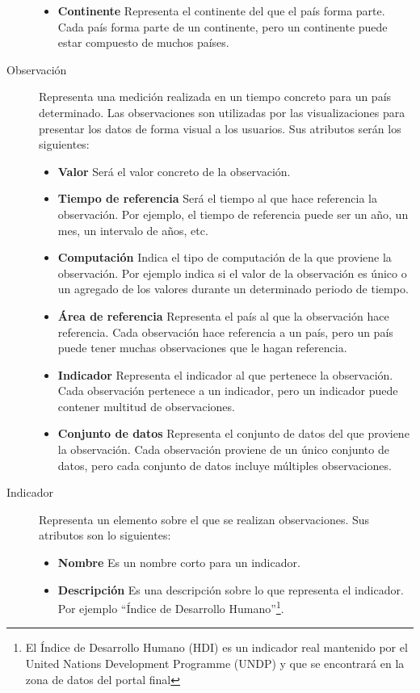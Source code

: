 \begin{description}
\begin{itemize}
							\item \textbf{Continente}  Representa el continente del que el país forma parte.  Cada país forma parte de un continente, pero un continente puede estar compuesto de muchos países.
							\end{itemize}
\item[Observación]  Representa una medición realizada en un tiempo concreto para un país determinado.  Las observaciones son utilizadas por las visualizaciones para presentar los datos de forma visual a los usuarios.  Sus atributos serán los siguientes:
							\begin{itemize}
							\item \textbf{Valor}  Será el valor concreto de la observación.
							\item \textbf{Tiempo de referencia}  Será el tiempo al que hace referencia la observación.  Por ejemplo, el tiempo de referencia puede ser un año, un mes, un intervalo de años, etc.
							\item \textbf{Computación}  Indica el tipo de computación de la que proviene la observación.  Por ejemplo indica si el valor de la observación es único o un agregado de los valores durante un determinado periodo de tiempo.
							\item \textbf{Área de referencia}  Representa el país al que la observación hace referencia.  Cada observación hace referencia a un país, pero un país puede tener muchas observaciones que le hagan referencia.
							\item \textbf{Indicador}  Representa el indicador al que pertenece la observación.  Cada observación pertenece a un indicador, pero un indicador puede contener multitud de observaciones.
							\item \textbf{Conjunto de datos}  Representa el conjunto de datos del que proviene la observación.  Cada observación proviene de un único conjunto de datos, pero cada conjunto de datos incluye múltiples observaciones.
							\end{itemize}
\item[Indicador]  Representa un elemento sobre el que se realizan observaciones.  Sus atributos son lo siguientes:
							\begin{itemize}
							\item \textbf{Nombre}  Es un nombre corto para un indicador.
							\item \textbf{Descripción}  Es una descripción sobre lo que representa el indicador.  Por ejemplo ``Índice de Desarrollo Humano''\footnote{El Índice de Desarrollo Humano (HDI) es un indicador real mantenido por el United Nations Development Programme (UNDP) y que se encontrará en la zona de datos del portal final}.

\end{itemize}
\end{description}
